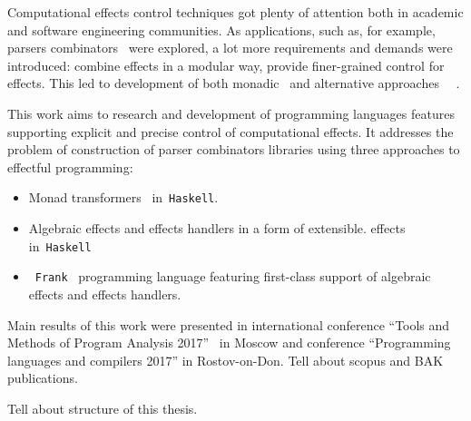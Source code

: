 Computational effects control techniques got plenty of attention both in academic and software engineering communities. As applications, such as, for example, parsers combinators~\cite{monParsing} were explored, a lot more requirements and demands
were introduced: combine effects in a modular way, provide finer-grained control
for effects. This led to development of both monadic~\cite{Liang:1995:MTM:199448.199528} and alternative approaches~\cite{Mcbride:2008:APE:1348940.1348941}
~\cite{DBLP:journals/jlp/BauerP15}.

This work aims to research and development of programming languages features supporting explicit and precise control of computational effects. It addresses the problem
of construction of parser combinators libraries using three approaches to
effectful programming:

\begin{itemize}
  \item Monad transformers~\cite{Liang:1995:MTM:199448.199528} in~\texttt{Haskell}.
  \item Algebraic effects and effects handlers in a form of extensible.
  effects~\cite{Kiselyov:2013:EEA:2578854.2503791} in~\texttt{Haskell}
  \item~\texttt{Frank}~\cite{DBLP:conf/popl/LindleyMM17} programming language featuring first-class support of algebraic
  effects and effects handlers.
\end{itemize}

Main results of this work were presented in  international conference ``Tools and Methods of Program Analysis 2017''~\cite{tmpa} in Moscow and conference
``Programming languages and compilers 2017'' in Rostov-on-Don.
Tell about scopus and BAK publications.

Tell about structure of this thesis.

